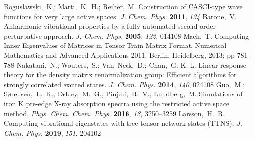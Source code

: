 \documentclass[journal=jctcce]{achemso}
\begin{document}
\begin{mcitethebibliography}{79}
Boguslawski,~K.; Marti,~K.~H.; Reiher,~M. {Construction of CASCI-type wave
  functions for very large active spaces}. \emph{J. Chem. Phys.} \textbf{2011},
  \emph{134}\relax
\mciteBstWouldAddEndPuncttrue
\mciteSetBstMidEndSepPunct{\mcitedefaultmidpunct}
{\mcitedefaultendpunct}{\mcitedefaultseppunct}\relax
\EndOfBibitem
{}
Barone,~V. {Anharmonic vibrational properties by a fully automated second-order
  perturbative approach}. \emph{J. Chem. Phys.} \textbf{2005}, \emph{122},
  014108\relax
\mciteBstWouldAddEndPuncttrue
\mciteSetBstMidEndSepPunct{\mcitedefaultmidpunct}
{\mcitedefaultendpunct}{\mcitedefaultseppunct}\relax
\EndOfBibitem
{}
Mach,~T. {Computing Inner Eigenvalues of Matrices in Tensor Train Matrix
  Format}. Numerical Mathematics and Advanced Applications 2011. Berlin,
  Heidelberg, 2013; pp 781--788\relax
\mciteBstWouldAddEndPuncttrue
\mciteSetBstMidEndSepPunct{\mcitedefaultmidpunct}
{\mcitedefaultendpunct}{\mcitedefaultseppunct}\relax
\EndOfBibitem
{}
Nakatani,~N.; Wouters,~S.; Van~Neck,~D.; Chan,~G. K.-L. {Linear response theory
  for the density matrix renormalization group: Efficient algorithms for
  strongly correlated excited states}. \emph{J. Chem. Phys.} \textbf{2014},
  \emph{140}, 024108\relax
\mciteBstWouldAddEndPuncttrue
\mciteSetBstMidEndSepPunct{\mcitedefaultmidpunct}
{\mcitedefaultendpunct}{\mcitedefaultseppunct}\relax
\EndOfBibitem
{}
Guo,~M.; Sørensen,~L.~K.; Delcey,~M.~G.; Pinjari,~R.~V.; Lundberg,~M.
  {Simulations of iron K pre-edge X-ray absorption spectra using the restricted
  active space method}. \emph{Phys. Chem. Chem. Phys.} \textbf{2016},
  \emph{18}, 3250--3259\relax
\mciteBstWouldAddEndPuncttrue
\mciteSetBstMidEndSepPunct{\mcitedefaultmidpunct}
{\mcitedefaultendpunct}{\mcitedefaultseppunct}\relax
\EndOfBibitem
{}
Larsson,~H.~R. {Computing vibrational eigenstates with tree tensor network
  states (TTNS)}. \emph{J. Chem. Phys.} \textbf{2019}, \emph{151}, 204102\relax
\mciteBstWouldAddEndPuncttrue
\mciteSetBstMidEndSepPunct{\mcitedefaultmidpunct}
{\mcitedefaultendpunct}{\mcitedefaultseppunct}\relax
\EndOfBibitem
\end{mcitethebibliography}

%
\end{document}
